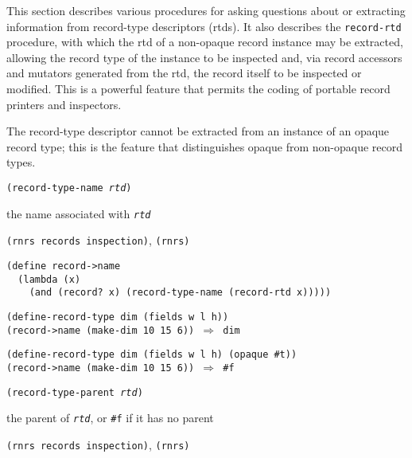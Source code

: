 This section describes various procedures for asking questions about
or extracting information from record-type descriptors (rtds).
It also describes the \texttt{record-rtd} procedure, with which the
rtd of a non-opaque record instance may be extracted, allowing the record
type of the instance to be inspected and, via record accessors and
mutators generated from the rtd, the record itself to be inspected
or modified.
This is a powerful feature that permits the coding of portable record
printers and inspectors.


\label{records_s33}The record-type descriptor cannot be extracted from an instance of an
opaque record type; this is the feature that distinguishes opaque
from non-opaque record types.


\begin{description}

\label{records_s34}\item[procedure] \texttt{(record-type-name \textit{rtd})}



\item[returns] the name associated with \texttt{\textit{rtd}}


\item[libraries] \texttt{(rnrs records inspection)}, \texttt{(rnrs)}
\end{description}


\begin{alltt}
(define record-\textgreater{}name
  (lambda (x)
    (and (record? x) (record-type-name (record-rtd x)))))

(define-record-type dim (fields w l h))
(record-\textgreater{}name (make-dim 10 15 6)) \(\Rightarrow\) dim

(define-record-type dim (fields w l h) (opaque \#{}t))
(record-\textgreater{}name (make-dim 10 15 6)) \(\Rightarrow\) \#{}f
\end{alltt}

\begin{description}

\label{records_s35}\item[procedure] \texttt{(record-type-parent \textit{rtd})}



\item[returns] the parent of \texttt{\textit{rtd}}, or \texttt{\#{}f} if it has no parent


\item[libraries] \texttt{(rnrs records inspection)}, \texttt{(rnrs)}
\end{description}


